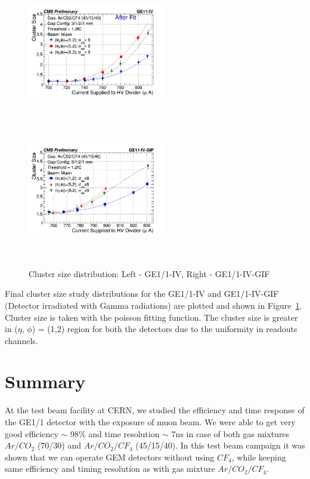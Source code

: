  \begin{figure}[!htbp]
   \begin{center}
     \includegraphics[width=6cm,height=6cm]{figures/GEM/CurrentvsClusterSizeAll3EtaPhi.png}
     \includegraphics[width=6cm,height=6cm]{figures/GEM/CurrentvsClusterSizeAll3EtaPhiGE11IVGIF.png}
   \end{center}
   \caption{Cluster size distribution: Left - GE1/1-IV, Right - GE1/1-IV-GIF}
   \label{fig:CSDGE1/1}
 \end{figure}

 Final cluster size study distributions for the GE1/1-IV and GE1/1-IV-GIF (Detector irradiated with Gamma radiations) are plotted and shown in Figure~\ref{fig:CSDGE1/1}. Cluster size is taken with the poisson fitting function. The cluster size is greater in ($\eta$, $\phi$) = (1,2) region for both the detectors due to the uniformity in readouts channels.




% 



\section{Summary}
At the test beam facility at CERN, we studied the efficiency and time response of the GE1/1 detector with the exposure of muon beam. We were able to get very good efficiency $\sim$ 98\% and time resolution $\sim$ 7ns in case of both gas mixtures $Ar/CO_2$ (70/30) and $Ar/CO_2/CF_4$ (45/15/40). In this test beam campaign it was shown that we can operate GEM detectors without using $CF_4$, while keeping same efficiency and timing resolution as with gas mixture $Ar/CO_2/CF_4$.

